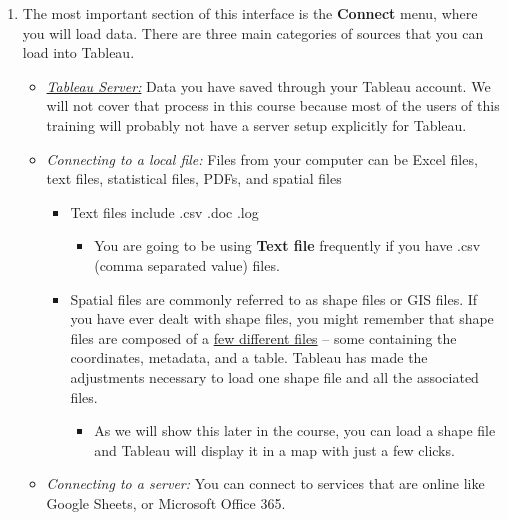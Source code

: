 \documentclass[
]{book}
\providecommand{\tightlist}{%
  \setlength{\itemsep}{0pt}\setlength{\parskip}{0pt}}
\begin{document}
\begin{enumerate}
\def\labelenumi{\arabic{enumi}.}
\tightlist
\item
  The most important section of this interface is the \textbf{Connect} menu, where you will load data. There are three main categories of sources that you can load into Tableau.

  \begin{itemize}
  \tightlist
  \item
    \href{https://www.tableau.com/trial/tableau-server?utm_campaign_id=2017049\&utm_campaign=Prospecting-PROD-ALL-ALL-ALL-ALL\&utm_medium=Paid+Search\&utm_source=Bing\&utm_language=EN\&utm_country=USCA\&kw=tableau\%20server\&adgroup=CTX-Brand-Tableau+Server-E\&adused=ETA\&matchtype=e\&placement=\&gclid=c64d924d9b59166571a0f375554410ea\&gclsrc=3p.ds\&msclkid=c64d924d9b59166571a0f375554410ea}{\emph{Tableau Server:}} Data you have saved through your Tableau account. We will not cover that process in this course because most of the users of this training will probably not have a server setup explicitly for Tableau.
  \item
    \emph{Connecting to a local file:} Files from your computer can be Excel files, text files, statistical files, PDFs, and spatial files

    \begin{itemize}
    \tightlist
    \item
      Text files include .csv .doc .log

      \begin{itemize}
      \tightlist
      \item
        You are going to be using \textbf{Text file} frequently if you have .csv (comma separated value) files.
      \end{itemize}
    \item
      Spatial files are commonly referred to as shape files or GIS files. If you have ever dealt with shape files, you might remember that shape files are composed of a \href{https://gisgeography.com/arcgis-shapefile-files-types-extensions/}{few different files} -- some containing the coordinates, metadata, and a table. Tableau has made the adjustments necessary to load one shape file and all the associated files.

      \begin{itemize}
      \tightlist
      \item
        As we will show this later in the course, you can load a shape file and Tableau will display it in a map with just a few clicks.
      \end{itemize}
    \end{itemize}
  \item
    \emph{Connecting to a server:} You can connect to services that are online like Google Sheets, or Microsoft Office 365.


\end{itemize}
\end{enumerate}
\end{document}
